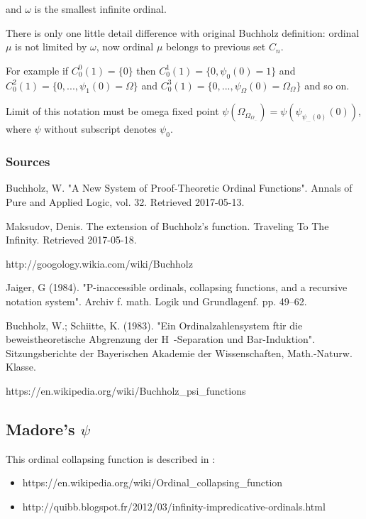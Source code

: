 \documentclass[10pt]{article}
\begin{document}
and \(\omega\) is the smallest infinite ordinal.

There is only one little detail difference with original Buchholz definition: ordinal \(\mu\) is not limited by \(\omega\), now ordinal \(\mu\) belongs to previous set \(C_n\).

For example if \(C_0^0(1)=\{0\}\) then \(C_0^1(1)=\{0,\psi_0(0)=1\}\) and \(C_0^2(1)=\{0,...,\psi_1(0)=\Omega\}\) and \(C_0^3(1)=\{0,...,\psi_\Omega(0)=\Omega_\Omega\}\) and so on.

Limit of this notation must be omega fixed point \(\psi(\Omega_{\Omega_{\Omega_{...}}})=\psi(\psi_{\psi_{...}(0)}(0))\), where \(\psi\) without subscript denotes \(\psi_0\).

\subsubsection{Sources}

Buchholz, W. "A New System of Proof-Theoretic Ordinal Functions". Annals of Pure and Applied Logic, vol. 32. Retrieved 2017-05-13.

Maksudov, Denis. The extension of Buchholz's function. Traveling To The Infinity. Retrieved 2017-05-18.

http://googology.wikia.com/wiki/Buchholz%

Jaiger, G (1984). "P-inaccessible ordinals, collapsing functions, and a recursive notation system". Archiv f. math. Logik und Grundlagenf. pp. 49–62.

Buchholz, W.; Schiitte, K. (1983). "Ein Ordinalzahlensystem ftir die beweistheoretische Abgrenzung der H~-Separation und Bar-Induktion". Sitzungsberichte der Bayerischen Akademie der Wissenschaften, Math.-Naturw. Klasse.

https://en.wikipedia.org/wiki/Buchholz\_psi\_functions


\subsection{Madore's \( \psi \)}

This ordinal collapsing function is described in :

\begin{itemize}
     \setlength{\itemsep}{1pt}
     \setlength{\parskip}{0pt}
     \setlength{\parsep}{0pt}
\item https://en.wikipedia.org/wiki/Ordinal\_collapsing\_function 
\item http://quibb.blogspot.fr/2012/03/infinity-impredicative-ordinals.html 
\end{itemize}
\end{document}
